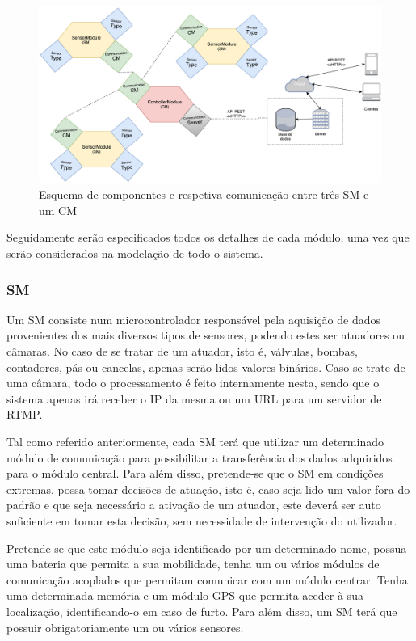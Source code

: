\begin{figure}[h]
	\centering
	\includegraphics[width=\linewidth]{esquemas/general-electronic-modules.pdf}
	\caption{Esquema de componentes e respetiva comunicação entre três \ac{SM} e um \ac{CM}}
	\label{esquema1}
\end{figure}


Seguidamente serão especificados todos os detalhes de cada módulo, uma vez que serão considerados na modelação de todo o sistema. 



\subsubsection{\acl{SM}}



Um \acl{SM} consiste num microcontrolador responsável pela aquisição de dados provenientes dos mais diversos tipos de sensores, podendo estes ser atuadores ou câmaras. No caso de se tratar de um atuador, isto é, válvulas, bombas, contadores, pás ou cancelas, apenas serão lidos valores binários. Caso se trate de uma câmara, todo o processamento é feito internamente nesta, sendo que o sistema apenas irá receber o \ac{IP} da mesma ou um \ac{URL} para um servidor de \ac{RTMP}.  


Tal como referido anteriormente, cada \acl{SM} terá que utilizar um determinado módulo de comunicação para possibilitar a transferência dos dados adquiridos para o módulo central. Para além disso, pretende-se que o \acl{SM} em condições extremas, possa tomar decisões de atuação, isto é, caso seja lido um valor fora do padrão e que seja necessário a ativação de um atuador, este deverá ser auto suficiente em tomar esta decisão, sem necessidade de intervenção do utilizador. 

Pretende-se que este módulo seja identificado por um determinado nome, possua uma bateria que permita a sua mobilidade, tenha um ou vários módulos de comunicação acoplados que permitam comunicar com um módulo centrar. Tenha uma determinada memória e um módulo \ac{GPS} que permita aceder à sua localização, identificando-o em caso de furto. Para além disso, um \acl{SM} terá que possuir obrigatoriamente um ou vários sensores.








